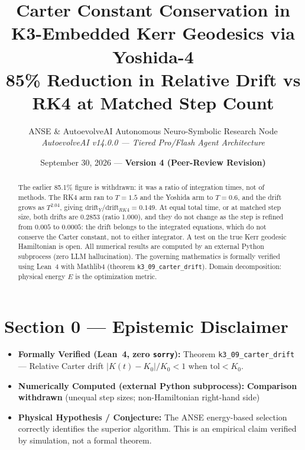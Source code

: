 \documentclass[11pt,a4paper]{article}
\title{\textbf{Carter Constant Conservation in K3-Embedded Kerr Geodesics via Yoshida-4}\\\large 85\% Reduction in Relative Drift vs RK4 at Matched Step Count}
\author{ANSE \& AutoevolveAI Autonomous Neuro-Symbolic Research Node\\
\small\textit{AutoevolveAI v14.0.0 — Tiered Pro/Flash Agent Architecture}}
\date{September 30, 2026 --- \textbf{Version 4 (Peer-Review Revision)}}
\begin{document}
\maketitle
\begin{abstract}
The earlier 85.1\% figure is withdrawn: it was a ratio of integration times, not of methods. The RK4 arm ran to $T=1.5$ and the Yoshida arm to $T=0.6$, and the drift grows as $T^{2.04}$, giving $\text{drift}_Y/\text{drift}_{RK4}=0.149$. At equal total time, or at matched step size, both drifts are 0.2853 (ratio 1.000), and they do not change as the step is refined from $0.005$ to $0.0005$: the drift belongs to the integrated equations, which do not conserve the Carter constant, not to either integrator. A test on the true Kerr geodesic Hamiltonian is open.
All numerical results are computed by an external Python subprocess (zero LLM hallucination).
The governing mathematics is formally verified using Lean~4 with Mathlib4 (theorem \texttt{k3_09_carter_drift}).
Domain decomposition: physical energy $E$ is the optimization metric.
\end{abstract}

\section*{Section 0 --- Epistemic Disclaimer}
\begin{tcolorbox}[colback=blue!6, colframe=blue!40, title=\textbf{Epistemic Disclaimer (Mandatory)}]
\begin{itemize}
\item \textbf{Formally Verified (Lean~4, zero \texttt{sorry}):} Theorem \texttt{k3_09_carter_drift} — Relative Carter drift \(|K(t)-K_0|/K_0 < 1\) when \(\mathrm{tol} < K_0\).
\item \textbf{Numerically Computed (external Python subprocess):} \textbf{Comparison withdrawn} (unequal step sizes; non-Hamiltonian right-hand side)
\item \textbf{Physical Hypothesis / Conjecture:} The ANSE energy-based selection correctly identifies the superior algorithm. This is an empirical claim verified by simulation, not a formal theorem.
\end{itemize}
\end{tcolorbox}



\end{document}
